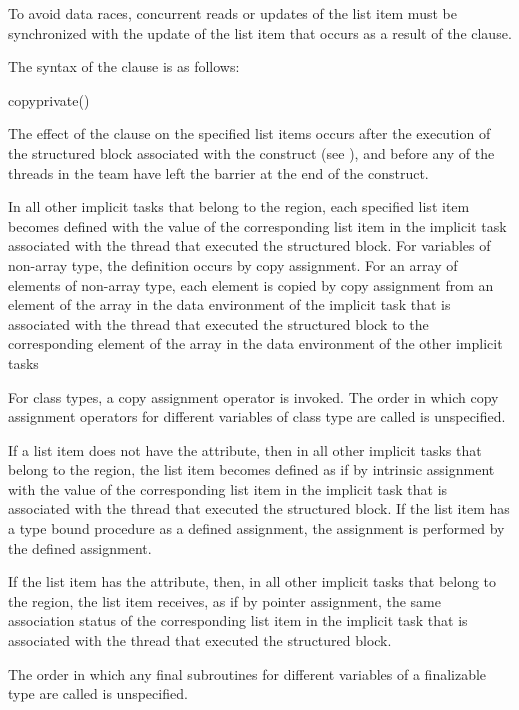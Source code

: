 To avoid data races, concurrent reads or updates of the list item must be
synchronized with the update of the list item that occurs as a result of the
 clause.

\syntax
The syntax of the  clause is as follows:

\begin{ompSyntax}
copyprivate()
\end{ompSyntax}

\descr
The effect of the  clause on the specified list items occurs 
after the execution of the structured block associated with the  
construct (see ), and before any of the threads 
in the team have left the barrier at the end of the construct.

\begin{ccppspecific}
In all other implicit tasks that belong to the  region, each 
specified list item becomes defined with the value of the corresponding list 
item in the implicit task associated with the thread that executed the 
structured block. For variables of non-array type, the definition occurs by 
copy assignment. For an array of elements of non-array type, each element is
copied by copy assignment from an element of the array in the data environment of the
implicit task that is associated with the thread that executed the structured 
block to the corresponding element of the array in the data environment of the 
other implicit tasks
\end{ccppspecific}

\begin{cppspecific}
For class types, a copy assignment operator is invoked. The order in which copy
assignment operators for different variables of class type are called is unspecified.
\end{cppspecific}

\begin{fortranspecific}
If a list item does not have the  attribute, then in all other 
implicit tasks that belong to the  region, the list item becomes 
defined as if by intrinsic assignment with the value of the corresponding list 
item in the implicit task that is associated with the thread that executed the 
structured block.  If the list item has a type bound procedure as a defined 
assignment, the assignment is performed by the defined assignment.

If the list item has the  attribute, then, in all other implicit 
tasks that belong to the  region, the list item receives, as if by 
pointer assignment, the same association status of the corresponding list item in the 
implicit task that is associated with the thread that executed the structured block.

The order in which any final subroutines for different variables of a finalizable 
type are called is unspecified.
\end{fortranspecific}

